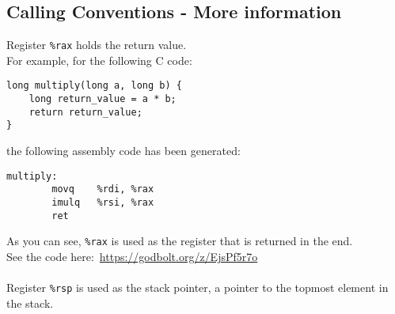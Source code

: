 \subsection{Calling Conventions - More information}
Register \texttt{\%rax} holds the return value. \\
\noindent For example, for the following C code:
\begin{verbatim}
long multiply(long a, long b) {
    long return_value = a * b;
    return return_value;
}
\end{verbatim}
\noindent the following assembly code has been generated:
\begin{verbatim}
multiply:
        movq    %rdi, %rax
        imulq   %rsi, %rax
        ret
\end{verbatim}
%
As you can see, \texttt{\%rax} is used as the register that is returned in the end. \\
%
See the code here:~\url{https://godbolt.org/z/EjsPf5r7o} \\
\\
%
Register \texttt{\%rsp} is used as the stack pointer, a pointer to the topmost element in the
 stack.
\clearpage